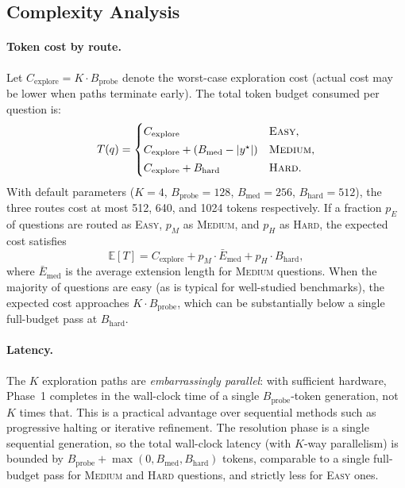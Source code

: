 \subsection{Complexity Analysis}
\label{sec:method:complexity}

\paragraph{Token cost by route.}
Let $C_{\mathrm{explore}} = K \cdot B_{\mathrm{probe}}$ denote the
worst-case exploration cost (actual cost may be lower when paths terminate
early).
The total token budget consumed per question is:
\begin{equation}
  \label{eq:cost}
  T(q) =
  \begin{cases}
    C_{\mathrm{explore}}
      & \textsc{Easy}, \\[2pt]
    C_{\mathrm{explore}} + (B_{\mathrm{med}} - |y^{\star}|)
      & \textsc{Medium}, \\[2pt]
    C_{\mathrm{explore}} + B_{\mathrm{hard}}
      & \textsc{Hard}.
  \end{cases}
\end{equation}
With default parameters ($K{=}4$, $B_{\mathrm{probe}}{=}128$,
$B_{\mathrm{med}}{=}256$, $B_{\mathrm{hard}}{=}512$), the three routes
cost at most 512, 640, and 1024 tokens respectively.
If a fraction $p_E$ of questions are routed as \textsc{Easy}, $p_M$ as
\textsc{Medium}, and $p_H$ as \textsc{Hard}, the expected cost satisfies
\begin{equation}
  \label{eq:expected-cost}
  \mathbb{E}[T] = C_{\mathrm{explore}}
    + p_M \cdot \bar{E}_{\mathrm{med}}
    + p_H \cdot B_{\mathrm{hard}},
\end{equation}
where $\bar{E}_{\mathrm{med}}$ is the average extension length for
\textsc{Medium} questions.
When the majority of questions are easy (as is typical for well-studied
benchmarks), the expected cost approaches $K \cdot B_{\mathrm{probe}}$,
which can be substantially below a single full-budget pass at
$B_{\mathrm{hard}}$.

\paragraph{Latency.}
The $K$ exploration paths are \emph{embarrassingly parallel}: with
sufficient hardware, Phase~1 completes in the wall-clock time of a single
$B_{\mathrm{probe}}$-token generation, not $K$ times that.
This is a practical advantage over sequential methods such as progressive
halting or iterative refinement.
The resolution phase is a single sequential generation, so the total
wall-clock latency (with $K$-way parallelism) is bounded by
$B_{\mathrm{probe}} + \max(0, B_{\mathrm{med}}, B_{\mathrm{hard}})$
tokens, comparable to a single full-budget pass for \textsc{Medium}
and \textsc{Hard} questions, and strictly less for \textsc{Easy} ones.

